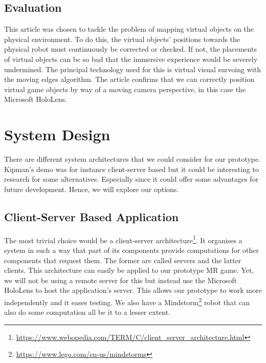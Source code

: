 
\subsection{Evaluation}
This article was chosen to tackle the problem of mapping virtual objects on the physical environment. To do this, the virtual objects' positions towards the physical robot must continuously be corrected or checked. If not, the placements of virtual objects can be so bad that the immersive experience would be severely undermined. The principal technology used for this is virtual visual survoing with the moving edges algorithm. The article\cite{comport2003real} confirms that we can correctly position virtual game objects by way of a moving camera perspective, in this case the Microsoft HoloLens.

\section{System Design}
There are different system architectures that we could consider for our prototype. Kipman's demo was for instance client-server based but it could be interesting to research for some alternatives. Especially since it could offer some advantages for future development. Hence, we will explore our options.

\subsection{Client-Server Based Application}
The most trivial choice would be a client-server architecture\footnote{\url{https://www.webopedia.com/TERM/C/client\_server\_architecture.html}}. It organises a system in such a way that part of its components provide computations for other components that request them. The former are called servers and the latter clients. \newline
This architecture can easily be applied to our prototype MR game. Yet, we will not be using a remote server\cite{funkhouser1995ring} for this but instead use the Microsoft HoloLens to host the application's server. This allows our prototype to work more independently and it eases testing. We also have a Mindstorm\footnote{\url{https://www.lego.com/en-us/mindstorms}} robot that can also do some computation all be it to a lesser extent. 

